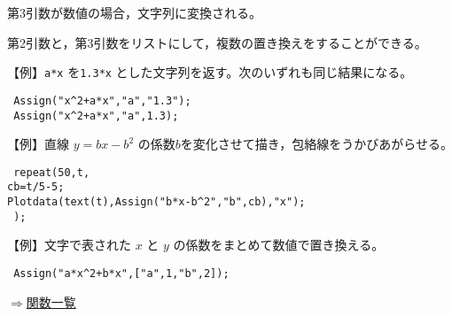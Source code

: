 \documentclass[papersize,a4paper,10pt,uplatex]{jsarticle}
\begin{document}
\begin{description}
第3引数が数値の場合，文字列に変換される。

第2引数と，第3引数をリストにして，複数の置き換えをすることができる。

\vspace{\baselineskip}
【例】\verb|a*x| を\verb|1.3*x| とした文字列を返す。次のいずれも同じ結果になる。
\begin{verbatim}
 Assign("x^2+a*x","a","1.3"); 
 Assign("x^2+a*x","a",1.3);
\end{verbatim}

\vspace{\baselineskip}
【例】直線 $y=bx-b^2$ の係数$b$を変化させて描き，包絡線をうかびあがらせる。
\begin{verbatim}
 repeat(50,t,
cb=t/5-5;
Plotdata(text(t),Assign("b*x-b^2","b",cb),"x");
 );
\end{verbatim}
\begin{center}  \end{center}
\vspace{\baselineskip}
【例】文字で表された $x$ と $y$ の係数をまとめて数値で置き換える。
\begin{verbatim} 
 Assign("a*x^2+b*x",["a",1,"b",2]);
\end{verbatim}

\begin{flushright}\hyperlink{functionlist}{$\Rightarrow$関数一覧}\end{flushright}


\begin{comment}

\vspace{\baselineskip}
\hypertarget{com0th}{}
\item[関数]Com0th(文字列）
\item[機能]RのOpenfileの前に置くコマンド（文字列）を定義する。
\item[説明]【例】\verb|Com0th("Setax('a')");|

Openfileの前の部分の先頭に書き出す。これにより， \ketcindy でサポートされていないR版\ketpic のコマンドを利用することができる。

\vspace{\baselineskip}
\hypertarget{com1st}{}
\item[関数]Com1st(文字列）
\item[機能]RのOpenfileの前に置くコマンド（文字列）を定義する。
\item[説明]【例】\verb|Com1st("Setax('a')");|\\
これにより， \ketcindy でサポートされていないR版\ketpic のコマンドを利用することができる。



\end{comment}
\end{description}
\end{document}
